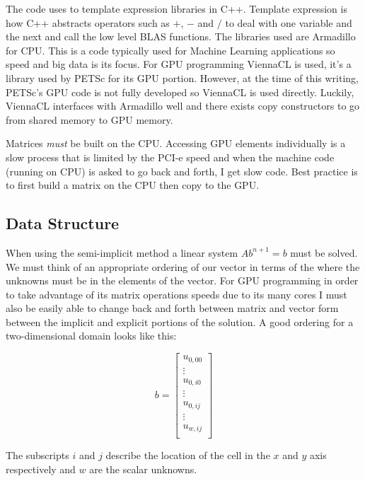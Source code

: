 \documentclass[12pt,upcase]{umlthesis}
\begin{document}
The code uses to template expression libraries in C++. Template expression is how C++ abstracts operators such as $+$, $-$ and $/$ to deal with one variable and the next and call the low level BLAS functions. The libraries used are Armadillo for CPU\@. This is a code typically used for Machine Learning applications so speed and big data is its focus. For GPU programming ViennaCL is used, it's a library used by PETSc for its GPU portion. However, at the time of this writing, PETSc's GPU code is not fully developed so ViennaCL is used directly. Luckily, ViennaCL interfaces with Armadillo well and there exists copy constructors to go from shared memory to GPU memory.

Matrices {\it must\/} be built on the CPU\@. Accessing GPU elements individually is a slow process that is limited by the PCI-e speed and when the machine code (running on CPU) is asked to go back and forth, I get slow code. Best practice is to first build a matrix on the CPU then copy to the GPU\@.

\subsection{Data Structure}\label{sec:datastructure}

When using the semi-implicit method a linear system $Ab^{n+1}=b$ must be solved. We must think of an appropriate ordering of our vector in terms of the where the unknowns must be in the elements of the vector. For GPU programming in order to take advantage of its matrix operations speeds due to its many cores I must also be easily able to change back and forth between matrix and vector form between the implicit and explicit portions of the solution. A good ordering for a two-dimensional domain looks like this:

\begin{equation}
	b =
\begin{bmatrix}
	u_{0,00} \\
	\vdots \\
	u_{0,i0} \\
	\vdots \\
	u_{0,ij} \\
	\vdots \\
	u_{w,ij} \\
\end{bmatrix}
\end{equation}

The subscripts $i$ and $j$ describe the location of the cell in the $x$ and $y$ axis respectively and $w$ are the scalar unknowns.
\end{document}
